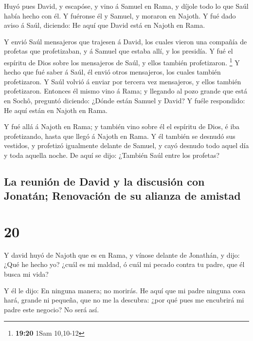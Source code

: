  Huyó pues David, y escapóse, y vino á Samuel en Rama, y
díjole todo lo que Saúl había hecho con él. Y fuéronse él y Samuel, y
moraron en Najoth.  Y fué dado aviso á Saúl, diciendo: He
aquí que David está en Najoth en Rama.

 Y envió Saúl mensajeros que trajesen á David, los cuales
vieron una compañía de profetas que profetizaban, y á Samuel que estaba
allí, y los presidía. Y fué el espíritu de Dios sobre los mensajeros de
Saúl, y ellos también profetizaron. \footnote{\textbf{19:20} 1Sam
  10,10-12}  Y hecho que fué saber á Saúl, él envió otros
mensajeros, los cuales también profetizaron. Y Saúl volvió á enviar por
tercera vez mensajeros, y ellos también profetizaron. 
Entonces él mismo vino á Rama; y llegando al pozo grande que está en
Sochô, preguntó diciendo: ¿Dónde están Samuel y David? Y fuéle
respondido: He aquí están en Najoth en Rama.

 Y fué allá á Najoth en Rama; y también vino sobre él el
espíritu de Dios, é iba profetizando, hasta que llegó á Najoth en Rama.
 Y él también se desnudó sus vestidos, y profetizó
igualmente delante de Samuel, y cayó desnudo todo aquel día y toda
aquella noche. De aquí se dijo: ¿También Saúl entre los profetas?

\hypertarget{la-reuniuxf3n-de-david-y-la-discusiuxf3n-con-jonatuxe1n-renovaciuxf3n-de-su-alianza-de-amistad}{%
\subsection{La reunión de David y la discusión con Jonatán; Renovación
de su alianza de
amistad}\label{la-reuniuxf3n-de-david-y-la-discusiuxf3n-con-jonatuxe1n-renovaciuxf3n-de-su-alianza-de-amistad}}

\hypertarget{section-19}{%
\section{20}\label{section-19}}

 Y david huyó de Najoth que es en Rama, y vínose delante de
Jonathán, y dijo: ¿Qué he hecho yo? ¿cuál es mi maldad, ó cuál mi pecado
contra tu padre, que él busca mi vida?

 Y él le dijo: En ninguna manera; no morirás. He aquí que mi
padre ninguna cosa hará, grande ni pequeña, que no me la descubra: ¿por
qué pues me encubrirá mi padre este negocio? No será así.

